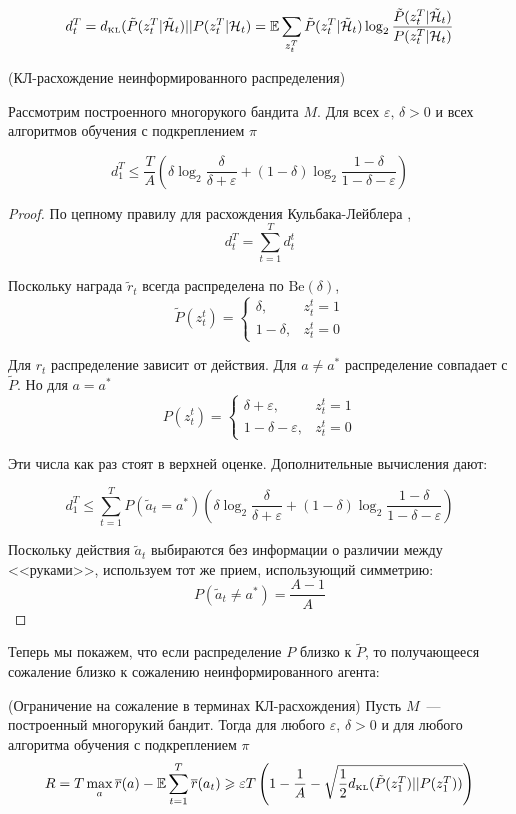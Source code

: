 \documentclass[a4paper]{article}
\newcommand{\Hh}{\mathcal{H}}
\newcommand{\E}{\mathbb{E}}
\newcommand{\Be}{\mbox{Be}}
\newcommand{\dkl}{d_{\mbox{\tiny KL}}}
\newcommand{\ltwo}{\log_2 }
\def\eps{\varepsilon}
\begin{document}
$$d_t^T=\dkl(\tilde{P}(z_t^T|\tilde{\Hh}_t)||P(z_t^T|\Hh_t)=\E\sum\limits_{z_t^T}\tilde{P}(z_t^T|\tilde{\Hh}_t)\ltwo\frac{\tilde{P}(z_t^T|\tilde{\Hh}_t)}{P(z_t^T|\Hh_t)}$$

\begin{lemma}{(КЛ-расхождение неинформированного распределения)}

Рассмотрим построенного многорукого бандита $M$. Для всех $\eps,\,\delta>0$ и всех алгоритмов обучения с подкреплением $\pi$

$$d_1^T\leqslant \frac{T}{A}\left(\delta\ltwo\frac{\delta}{\delta+\eps}+(1-\delta)\ltwo\frac{1-\delta}{1-\delta-\eps}\right)$$
\end{lemma}

\begin{proof} По цепному правилу для расхождения Кульбака-Лейблера \cite{bubeck}, \cite{games}
$$d_t^T=\sum\limits_{t=1}^T d_t^t$$

Поскольку награда $\tilde{r}_t$ всегда распределена по $\Be(\delta)$, $$\tilde{P}(z_t^t)=\begin{cases}
\delta, & z_t^t=1\\
1-\delta, & z_t^t=0
\end{cases}$$

Для $r_t$ распределение зависит от действия. Для $a\neq a^*$ распределение совпадает с $\tilde{P}$. Но для $a=a^*$
$$P(z_t^t)=\begin{cases}
\delta+\eps, & z_t^t=1\\
1-\delta-\eps, & z_t^t=0
\end{cases}$$

Эти числа как раз стоят в верхней оценке. Дополнительные вычисления \cite{bubeck} дают:

$$d_1^T\leqslant\sum\limits_{t=1}^T P(\tilde{a}_t= a^*)\left(\delta\ltwo\frac{\delta}{\delta+\eps}+(1-\delta)\ltwo\frac{1-\delta}{1-\delta-\eps}\right)$$

Поскольку действия $\tilde{a}_t$ выбираются без информации о различии между <<руками>>, используем тот же прием, использующий симметрию: $$P(\tilde{a}_t\neq a^*)=\frac{A-1}{A}$$
\end{proof}

Теперь мы покажем, что если распределение $P$ близко к $\tilde{P}$, то получающееся сожаление близко к сожалению неинформированного агента:

\begin{lemma}{(Ограничение на сожаление в терминах КЛ-расхождения)}
Пусть $M$~--- построенный многорукий бандит. Тогда для любого $\eps,\,\delta>0$ и для любого алгоритма обучения с подкреплением $\pi$
$$
R=T\max\limits_a\overline{r}(a)-\E\sum\limits_{t=1}^T\overline{r}(a_t)\geqslant \eps T \left(1-\frac{1}{A}-\sqrt{\frac{1}{2}\dkl(\tilde{P}(z_1^T)||P(z_1^T))}\right)
$$
\end{lemma}
\end{document}
